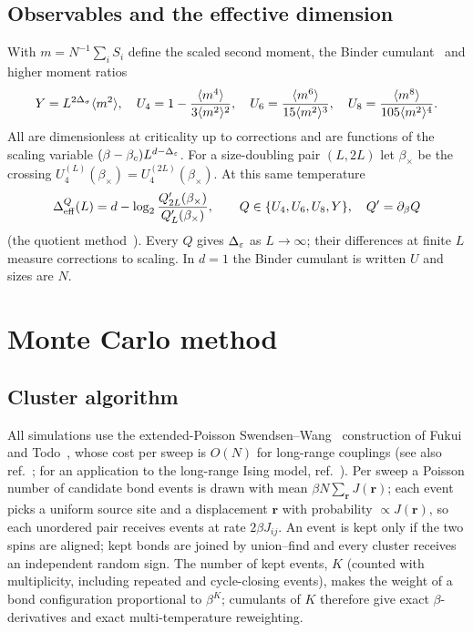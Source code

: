 \subsection{Observables and the effective dimension}
With $m=N^{-1}\sum_iS_i$ define the scaled second moment, the Binder cumulant~\cite{mc:Binder:1981sa} and higher moment ratios
\begin{equation}
 Y=L^{2\Delta_\sigma}\langle m^2\rangle,\quad U_4=1-\frac{\langle m^4\rangle}{3\langle m^2\rangle^2},\quad
 U_6=\frac{\langle m^6\rangle}{15\langle m^2\rangle^3},\quad U_8=\frac{\langle m^8\rangle}{105\langle m^2\rangle^4}.
\end{equation}
All are dimensionless at criticality up to corrections and are functions of the scaling variable $(\beta-\beta_c)L^{d-\Delta_\varepsilon}$. For a
size-doubling pair $(L,2L)$ let $\beta_\times$ be the crossing $U_4^{(L)}(\beta_\times)=U_4^{(2L)}(\beta_\times)$. At this same temperature
\begin{equation}
 \Delta_{\rm eff}^{Q}(L)=d-\log_2\frac{Q'_{2L}(\beta_\times)}{Q'_L(\beta_\times)},\qquad Q\in\{U_4,U_6,U_8,Y\},\quad Q'=\partial_\beta Q
 \label{mc:eq:Deff}
\end{equation}
(the quotient method~\cite{mc:Ballesteros:1996bd}). Every $Q$ gives $\Delta_\varepsilon$ as $L\to\infty$; their differences at finite $L$ measure corrections to
scaling. In $d=1$ the Binder cumulant is written $U$ and sizes are $N$.

\section{Monte Carlo method}\label{mc:sec:mc}
\subsection{Cluster algorithm}
All simulations use the extended-Poisson Swendsen--Wang~\cite{mc:Swendsen:1987ce} construction of Fukui and Todo~\cite{mc:Fukui:2009on}, whose cost
per sweep is $O(N)$ for long-range couplings (see also ref.~\cite{mc:Luijten:1995mc}; for an application to the long-range Ising model,
ref.~\cite{mc:Horita:2017ul}). Per sweep a Poisson number of candidate bond events is
drawn with mean $\beta N\sum_{\mathbf r}J(\mathbf r)$; each event picks a uniform source site and a displacement $\mathbf r$ with probability
$\propto J(\mathbf r)$, so each unordered pair receives events at rate $2\beta J_{ij}$. An event is kept only if the two spins are aligned;
kept bonds are joined by union--find and every cluster receives an independent random sign. The number of kept events, $K$ (counted with
multiplicity, including repeated and cycle-closing events), makes the weight of a bond configuration proportional to $\beta^K$; cumulants of
$K$ therefore give exact $\beta$-derivatives and exact multi-temperature reweighting.

